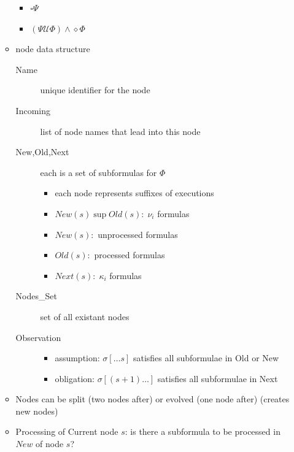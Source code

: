 \documentclass[a4paper, 10pt]{article}
\begin{document}
\begin{itemize}
\begin{itemize}
\begin{itemize}
            \item $\square\Psi$
            \item $(\Psi \mathcal{U} \Phi) \wedge \diamond \Phi$
        \end{itemize}
        \item node data structure
        \begin{multicols}{2}
        \begin{description}
            \item[Name] unique identifier for the node
            \item[Incoming] list of node names that lead into this node
            \item[New,Old,Next] each is a set of subformulas for $\Phi$
            \begin{itemize}
                \item each node represents suffixes of executions
                \item $New(s)\sup Old(s):\;\nu_i$ formulas
                \item $New(s):$ unprocessed formulas
                \item $Old(s):$ processed formulas
                \item $Next(s):\;\kappa_i$ formulas
            \end{itemize}
            \item[Nodes\_Set] set of all existant nodes
            \begin{center}
            \scalebox{1}{}
            \end{center}
            \item[Observation]
            \begin{itemize}
                \item assumption: $\sigma[\dots s]$ satisfies all subformulae in Old or New
                \item obligation: $\sigma[(s+1)\dots]$ satisfies all subformulae in Next
            \end{itemize}
        \end{description}
        \end{multicols}
        \item Nodes can be split (two nodes after) or evolved (one node after) (creates new nodes)
        \item Processing of Current node $s$: is there a subformula to be processed in $New$ of node $s$?
        \begin{description}

\end{description}
\end{itemize}
\end{itemize}
\end{document}
